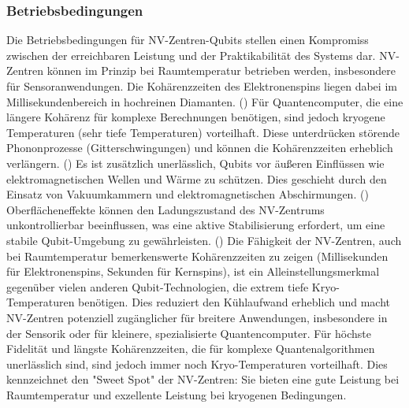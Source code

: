 \subsubsection{Betriebsbedingungen}
Die Betriebsbedingungen für NV-Zentren-Qubits stellen einen Kompromiss zwischen der erreichbaren Leistung und der Praktikabilität des Systems dar.
NV-Zentren können im Prinzip bei Raumtemperatur betrieben werden, insbesondere für Sensoranwendungen. Die Kohärenzzeiten des Elektronenspins liegen dabei im Millisekundenbereich in hochreinen Diamanten. (\cite{gmbhCCGFachartikelQuantencomputer2025}) Für Quantencomputer, die eine längere Kohärenz für komplexe Berechnungen benötigen, sind jedoch kryogene Temperaturen (sehr tiefe Temperaturen) vorteilhaft. Diese unterdrücken störende Phononprozesse (Gitterschwingungen) und können die Kohärenzzeiten erheblich verlängern. (\cite{childressDiamondNVCenters2013})
Es ist zusätzlich unerlässlich, Qubits vor äußeren Einflüssen wie elektromagnetischen Wellen und Wärme zu schützen. Dies geschieht durch den Einsatz von Vakuumkammern und elektromagnetischen Abschirmungen. (\cite{gmbhCCGFachartikelQuantencomputer2025}) Oberflächeneffekte können den Ladungszustand des NV-Zentrums unkontrollierbar beeinflussen, was eine aktive Stabilisierung erfordert, um eine stabile Qubit-Umgebung zu gewährleisten. (\cite{schreyvogelDynamischeManipulationNVZentren2017})
Die Fähigkeit der NV-Zentren, auch bei Raumtemperatur bemerkenswerte Kohärenzzeiten zu zeigen (Millisekunden für Elektronenspins, Sekunden für Kernspins), ist ein Alleinstellungsmerkmal gegenüber vielen anderen Qubit-Technologien, die extrem tiefe Kryo-Temperaturen benötigen. Dies reduziert den Kühlaufwand erheblich und macht NV-Zentren potenziell zugänglicher für breitere Anwendungen, insbesondere in der Sensorik oder für kleinere, spezialisierte Quantencomputer. Für höchste Fidelität und längste Kohärenzzeiten, die für komplexe Quantenalgorithmen unerlässlich sind, sind jedoch immer noch Kryo-Temperaturen vorteilhaft. Dies kennzeichnet den "Sweet Spot" der NV-Zentren: Sie bieten eine gute Leistung bei Raumtemperatur und exzellente Leistung bei kryogenen Bedingungen.

